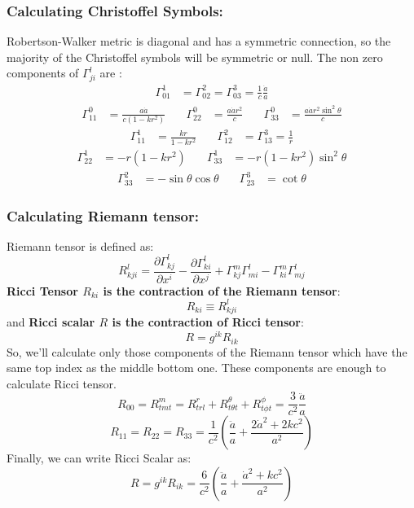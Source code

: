 \documentclass[12pt]{article}
\begin{document}
\subsubsection{Calculating Christoffel Symbols:}
Robertson-Walker metric is diagonal and has a symmetric connection,  so the majority of  the Christoffel symbols will be symmetric or null. The non zero components of $\Gamma_{j i}^{l}$ are :
\begin{align*}
\Gamma_{01}^{1}&=\Gamma_{02}^{2}=\Gamma_{03}^{3}=\frac{1}{c} \frac{\dot{a}}{a}
\end{align*}
\begin{align*}
\Gamma_{11}^{0}&=\frac{a \dot{a}}{c\left(1-k r^{2}\right)} &  \quad \Gamma_{22}^{0}&=\frac{a \dot{a} r^{2}}{c} &  \quad \Gamma_{33}^{0}&=\frac{a \dot{a} r^{2} \sin ^{2} \theta}{c}
\end{align*}
\begin{align*}
\Gamma_{11}^{1}&=\frac{k r}{1-k r^{2}} &  \quad \Gamma_{12}^{2}&=\Gamma_{13}^{3}=\frac{1}{r}
\end{align*}
\begin{align*}
\Gamma_{22}^{1}&=-r\left(1-k r^{2}\right) &  \quad \Gamma_{33}^{1}&=-r\left(1-k r^{2}\right) \sin ^{2} \theta
\end{align*}
\begin{align*}
\Gamma_{33}^{2}&=-\sin \theta \cos \theta &  \quad \Gamma_{23}^{3}&=\cot \theta
\end{align*} 
\subsubsection{Calculating Riemann tensor:}
Riemann tensor is defined as:
\begin{equation}
R_{k j i}^{l} = \frac{\partial \Gamma_{k j}^{l}}{\partial x^{i}}-\frac{\partial \Gamma_{k i}^{l}}{\partial x^{j}}+\Gamma_{k j}^{m} \Gamma_{m i}^{l}-\Gamma_{k i}^{m} \Gamma_{m j}^{l}
\label{37}
\end{equation}
\textbf{Ricci Tensor $R_{k i}$ is the contraction of the Riemann tensor}:
\begin{equation}
R_{k i} \equiv R_{k j i}^{l}
\end{equation}
and \textbf{Ricci scalar $R$ is the contraction of Ricci tensor}:
\begin{equation}
R=g^{i k} R_{i k}
\end{equation} 
So, we'll calculate only those components of the Riemann tensor which have the same top index as the middle bottom one. These components are enough to calculate Ricci tensor.
\begin{equation}
R_{0 0}=R_{t m t}^{m}=R_{t r l}^{r}+R_{t \theta t}^{\theta}+R_{t \phi t}^{\phi}= \frac{3}{c^{2}} \frac{\ddot{a}}{a}
\end{equation}
\begin{equation}
R_{1 1}=R_{2 2}=R_{3 3}=\frac{1}{c^{2}}\left(\frac{\ddot{a}}{a}+\frac{2 \dot{a}^{2}+2 k c^{2}}{a^{2}}\right)
\end{equation}
Finally, we can write Ricci Scalar as:
\begin{equation}
R=g^{i k} R_{i k} = \frac{6}{c^{2}}\left(\frac{\ddot{a}}{a}+\frac{\dot{a}^{2}+k c^{2}}{a^{2}}\right)
\end{equation} 
\end{document}
